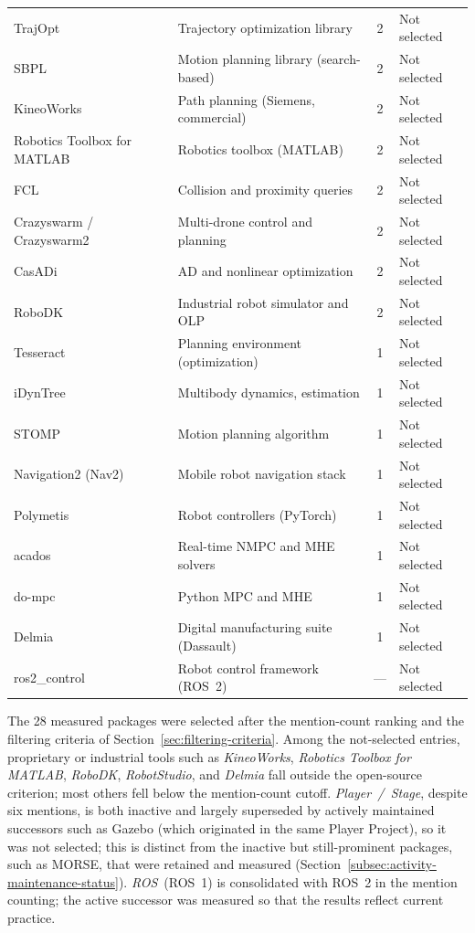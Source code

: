 \begin{singlespace}
\begin{longtable}{@{}p{3.7cm}p{4.6cm}cp{2.9cm}@{}}
TrajOpt & Trajectory optimization library & 2 & Not selected \\
SBPL & Motion planning library (search-based) & 2 & Not selected \\
KineoWorks & Path planning (Siemens, commercial) & 2 & Not selected \\
Robotics Toolbox for MATLAB & Robotics toolbox (MATLAB) & 2 & Not selected \\
FCL & Collision and proximity queries & 2 & Not selected \\
Crazyswarm / Crazyswarm2 & Multi-drone control and planning & 2 & Not selected \\
CasADi & AD and nonlinear optimization & 2 & Not selected \\
RoboDK & Industrial robot simulator and OLP & 2 & Not selected \\
Tesseract & Planning environment (optimization) & 1 & Not selected \\
iDynTree & Multibody dynamics, estimation & 1 & Not selected \\
STOMP & Motion planning algorithm & 1 & Not selected \\
Navigation2 (Nav2) & Mobile robot navigation stack & 1 & Not selected \\
Polymetis & Robot controllers (PyTorch) & 1 & Not selected \\
acados & Real-time NMPC and MHE solvers & 1 & Not selected \\
do-mpc & Python MPC and MHE & 1 & Not selected \\
Delmia & Digital manufacturing suite (Dassault) & 1 & Not selected \\
ros2\_control & Robot control framework (ROS~2) & --- & Not selected \\
\bottomrule
\end{longtable}
\end{singlespace}

The 28 measured packages were selected after the mention-count ranking and the filtering criteria of Section~\ref{sec:filtering-criteria}. Among the not-selected entries, proprietary or industrial tools such as \textit{KineoWorks}, \textit{Robotics Toolbox for MATLAB}, \textit{RoboDK}, \textit{RobotStudio}, and \textit{Delmia} fall outside the open-source criterion; most others fell below the mention-count cutoff. \textit{Player~/~Stage}, despite six mentions, is both inactive and largely superseded by actively maintained successors such as Gazebo (which originated in the same Player Project), so it was not selected; this is distinct from the inactive but still-prominent packages, such as MORSE, that were retained and measured (Section~\ref{subsec:activity-maintenance-status}). \textit{ROS}~(ROS~1) is consolidated with ROS~2 in the mention counting; the active successor was measured so that the results reflect current practice.
